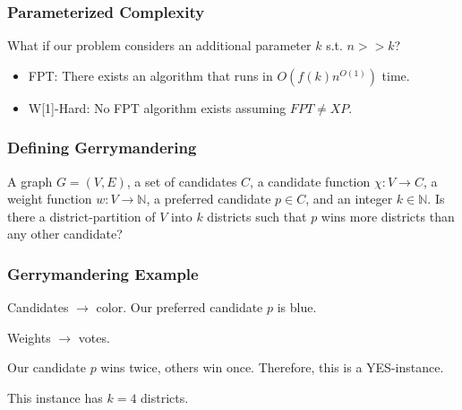 
\begin{frame}[t]
	\frametitle{Parameterized Complexity}
	What if our problem considers an additional parameter $k$ s.t. $n >> k$?
	\vspace{1.0cm}
	\begin{itemize}
		\item FPT: There exists an algorithm that runs in $O(f(k)n^{O(1)})$ time.
		\vspace{1.0cm}
		\item W[1]-Hard: No FPT algorithm exists assuming $FPT \neq XP$.
	\end{itemize}
\end{frame}

\begin{frame}[t]
	\frametitle{Defining Gerrymandering}
	\small
	{A graph $G = (V,E)$, a set of candidates $C$, a candidate function $\chi: V \rightarrow C$, a weight function $w: V \rightarrow \mathbb{N}$, a preferred candidate $p \in C$, and an integer $k \in \mathbb{N}$.}
	{Is there a district-partition of $V$ into $k$ districts such that $p$ wins more districts than any other candidate?}

	 {
			\begin{figure}
				\begin{center}
					
				\end{center}
			\end{figure}
	}
\end{frame}

\begin{frame}[t]
	\frametitle{Gerrymandering Example}
	\begin{figure}
		\begin{center}
			
		\end{center}
	\end{figure}

	\begin{itemize}
		\item Candidates $\rightarrow$ color. Our preferred candidate $p$ is blue.
		\item Weights $\rightarrow$ votes.
		\onslide<3> {
			\item Our candidate $p$ wins twice, others win once. Therefore, this is a YES-instance.
			\item This instance has $k=4$ districts.
		}
	\end{itemize}
\end{frame}
